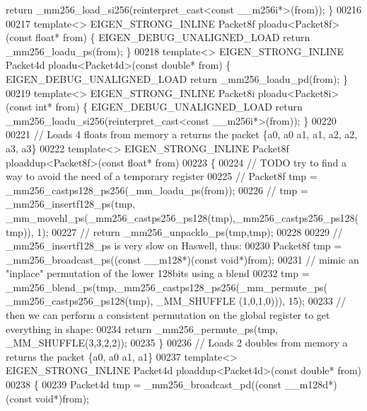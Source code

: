 \begin{DoxyCode}
{{{      return} \_mm256\_load\_si256(reinterpret\_cast<const \_\_m256i*>(from)); \}
00216 
00217 \textcolor{keyword}{template}<> EIGEN\_STRONG\_INLINE Packet8f ploadu<Packet8f>(\textcolor{keyword}{const} \textcolor{keywordtype}{float}* from) \{ EIGEN\_DEBUG\_UNALIGNED\_LOAD \textcolor{keywordflow}{
      return} \_mm256\_loadu\_ps(from); \}
00218 \textcolor{keyword}{template}<> EIGEN\_STRONG\_INLINE Packet4d ploadu<Packet4d>(\textcolor{keyword}{const} \textcolor{keywordtype}{double}* from) \{ EIGEN\_DEBUG\_UNALIGNED\_LOAD \textcolor{keywordflow}{
      return} \_mm256\_loadu\_pd(from); \}
00219 \textcolor{keyword}{template}<> EIGEN\_STRONG\_INLINE Packet8i ploadu<Packet8i>(\textcolor{keyword}{const} \textcolor{keywordtype}{int}* from) \{ EIGEN\_DEBUG\_UNALIGNED\_LOAD \textcolor{keywordflow}{
      return} \_mm256\_loadu\_si256(reinterpret\_cast<const \_\_m256i*>(from)); \}
00220 
00221 \textcolor{comment}{// Loads 4 floats from memory a returns the packet \{a0, a0  a1, a1, a2, a2, a3, a3\}}
00222 \textcolor{keyword}{template}<> EIGEN\_STRONG\_INLINE Packet8f ploaddup<Packet8f>(\textcolor{keyword}{const} \textcolor{keywordtype}{float}* from)
00223 \{
00224   \textcolor{comment}{// TODO try to find a way to avoid the need of a temporary register}
00225 \textcolor{comment}{//   Packet8f tmp  = \_mm256\_castps128\_ps256(\_mm\_loadu\_ps(from));}
00226 \textcolor{comment}{//   tmp = \_mm256\_insertf128\_ps(tmp,
       \_mm\_movehl\_ps(\_mm256\_castps256\_ps128(tmp),\_mm256\_castps256\_ps128(tmp)), 1);}
00227 \textcolor{comment}{//   return \_mm256\_unpacklo\_ps(tmp,tmp);}
00228   
00229   \textcolor{comment}{// \_mm256\_insertf128\_ps is very slow on Haswell, thus:}
00230   Packet8f tmp = \_mm256\_broadcast\_ps((\textcolor{keyword}{const} \_\_m128*)(\textcolor{keyword}{const} \textcolor{keywordtype}{void}*)from);
00231   \textcolor{comment}{// mimic an "inplace" permutation of the lower 128bits using a blend}
00232   tmp = \_mm256\_blend\_ps(tmp,\_mm256\_castps128\_ps256(\_mm\_permute\_ps( \_mm256\_castps256\_ps128(tmp), \_MM\_SHUFFLE
      (1,0,1,0))), 15);
00233   \textcolor{comment}{// then we can perform a consistent permutation on the global register to get everything in shape:}
00234   \textcolor{keywordflow}{return}  \_mm256\_permute\_ps(tmp, \_MM\_SHUFFLE(3,3,2,2));
00235 \}
00236 \textcolor{comment}{// Loads 2 doubles from memory a returns the packet \{a0, a0  a1, a1\}}
00237 \textcolor{keyword}{template}<> EIGEN\_STRONG\_INLINE Packet4d ploaddup<Packet4d>(\textcolor{keyword}{const} \textcolor{keywordtype}{double}* from)
00238 \{
00239   Packet4d tmp = \_mm256\_broadcast\_pd((\textcolor{keyword}{const} \_\_m128d*)(\textcolor{keyword}{const} \textcolor{keywordtype}{void}*)from);
}}
\end{DoxyCode}
